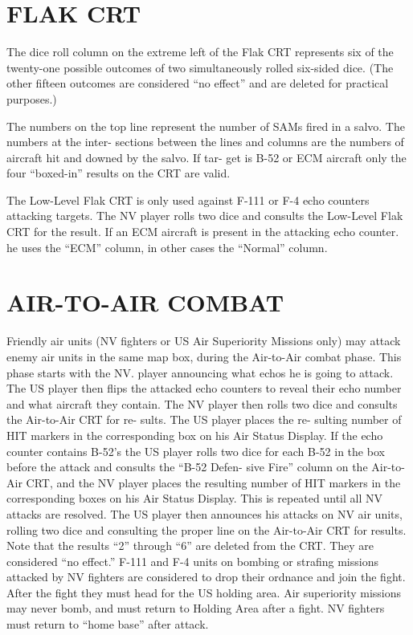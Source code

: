 
\section*{FLAK CRT}

The dice roll column on the extreme
left of the Flak CRT represents six of
the twenty-one possible outcomes of
two simultaneously rolled six-sided
dice. (The other fifteen outcomes are
considered ``no effect'' and are
deleted for practical purposes.)

The numbers on the top line
represent the number of SAMs fired
in a salvo. The numbers at the inter-
sections between the lines and
columns are the numbers of aircraft
hit and downed by the salvo. If tar-
get is B-52 or ECM aircraft only the
four ``boxed-in'' results on the CRT
are valid.

The Low-Level Flak CRT is only
used against F-111 or F-4 echo
counters attacking targets. The NV
player rolls two dice and consults the
Low-Level Flak CRT for the result. If
an ECM aircraft is present in the
attacking echo counter. he uses the
``ECM'' column, in other cases the
``Normal'' column.

\section*{AIR-TO-AIR COMBAT}

Friendly air units (NV fighters or US
Air Superiority Missions only) may
attack enemy air units in the same
map box, during the Air-to-Air
combat phase. This phase starts with
the NV. player announcing what
echos he is going to attack. The US
player then flips the attacked echo
counters to reveal their echo number
and what aircraft they contain. The
NV player then rolls two dice and
consults the Air-to-Air CRT for re-
sults. The US player places the re-
sulting number of HIT markers in the
corresponding box on his Air Status
Display. If the echo counter contains
B-52’s the US player rolls two dice
for each B-52 in the box before the
attack and consults the ``B-52 Defen-
sive Fire'' column on the Air-to-Air
CRT, and the NV player places the
resulting number of HIT markers in
the corresponding boxes on his Air
Status Display. This is repeated
until all NV attacks are resolved.
The US player then announces his
attacks on NV air units, rolling two
dice and consulting the proper line
on the Air-to-Air CRT for results.
Note that the results “2” through
“6” are deleted from the CRT. They
are considered “no effect.”
F-111 and F-4 units on bombing or
strafing missions attacked by NV
fighters are considered to drop their
ordnance and join the fight. After
the fight they must head for the US
holding area.
Air superiority missions may never
bomb, and must return to Holding
Area after a fight.
NV fighters must return to “home
base” after attack.


